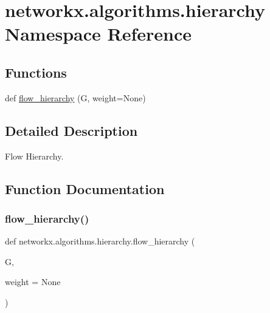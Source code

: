 \hypertarget{namespacenetworkx_1_1algorithms_1_1hierarchy}{}\section{networkx.\+algorithms.\+hierarchy Namespace Reference}
\label{namespacenetworkx_1_1algorithms_1_1hierarchy}
\subsection*{Functions}
\begin{DoxyCompactItemize}
\item 
def \hyperlink{namespacenetworkx_1_1algorithms_1_1hierarchy_a3a8122b6bde5d7db19f567f7cc2cd937}{flow\+\_\+hierarchy} (G, weight=None)
\end{DoxyCompactItemize}


\subsection{Detailed Description}
\begin{DoxyVerb}Flow Hierarchy.
\end{DoxyVerb}
 

\subsection{Function Documentation}
\mbox{\label{namespacenetworkx_1_1algorithms_1_1hierarchy_a3a8122b6bde5d7db19f567f7cc2cd937}} 
\subsubsection{\texorpdfstring{flow\+\_\+hierarchy()}{flow\_hierarchy()}}
{\footnotesize\ttfamily def networkx.\+algorithms.\+hierarchy.\+flow\+\_\+hierarchy (\begin{DoxyParamCaption}\item[{}]{G,  }\item[{}]{weight = {\ttfamily None} }\end{DoxyParamCaption})}

